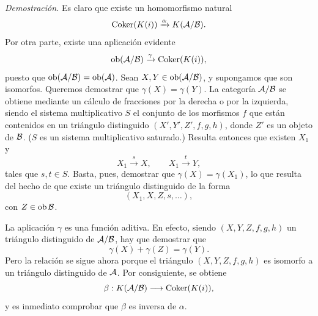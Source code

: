 \emph{Demostración.} Es claro que existe un homomorfismo natural
\[
\operatorname{Coker}(K(i))\xrightarrow{\alpha}K(\mathcal A/\mathcal B).
\]
Por otra parte, existe una aplicación evidente
\[
\operatorname{ob}(\mathcal A/\mathcal B)\xrightarrow{\gamma}\operatorname{Coker}(K(i)),
\]
puesto que $\operatorname{ob}(\mathcal A/\mathcal B)=\operatorname{ob}(\mathcal A)$. Sean $X,Y\in\operatorname{ob}(\mathcal A/\mathcal B)$, y supongamos que son isomorfos. Queremos demostrar que $\gamma(X)=\gamma(Y)$. La categoría $\mathcal A/\mathcal B$ se obtiene mediante un cálculo de fracciones por la derecha o por la izquierda, siendo el sistema multiplicativo $S$ el conjunto de los morfismos $f$ que están contenidos en un triángulo distinguido $(X',Y',Z',f,g,h)$, donde $Z'$ es un objeto de $\mathcal B$. ($S$ es un sistema multiplicativo saturado.) Resulta entonces que existen $X_1$ y
\[
X_1\xrightarrow{s}X,\qquad X_1\xrightarrow{t}Y,
\]
tales que $s,t\in S$. Basta, pues, demostrar que $\gamma(X)=\gamma(X_1)$, lo que resulta del hecho de que existe un triángulo distinguido de la forma
\[
(X_1,X,Z,s,\ldots),
\]
con $Z\in\operatorname{ob}\mathcal B$.

La aplicación $\gamma$ es una función aditiva. En efecto, siendo $(X,Y,Z,f,g,h)$ un triángulo distinguido de $\mathcal A/\mathcal B$, hay que demostrar que
\[
\gamma(X)+\gamma(Z)=\gamma(Y).
\]
Pero la relación se sigue ahora porque el triángulo $(X,Y,Z,f,g,h)$ es isomorfo a un triángulo distinguido de $\mathcal A$. Por consiguiente, se obtiene
\[
\beta:K(\mathcal A/\mathcal B)\longrightarrow \operatorname{Coker}(K(i)),
\]
y es inmediato comprobar que $\beta$ es inversa de $\alpha$.

